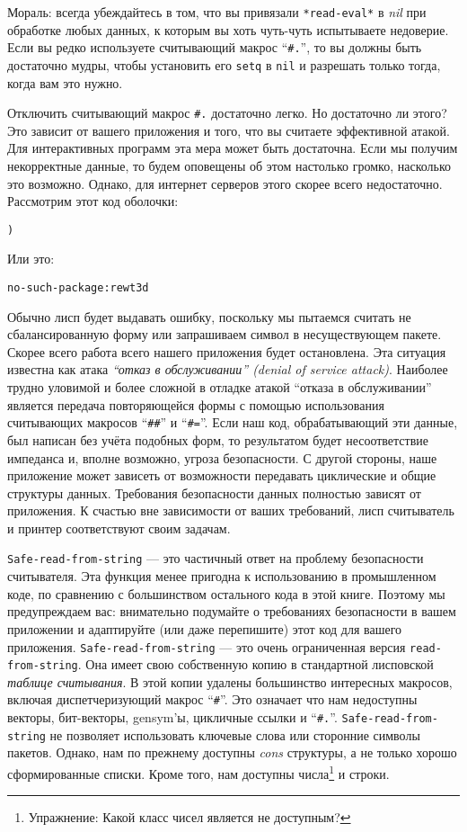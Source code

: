 Мораль: всегда убеждайтесь в том, что вы привязали \verb"*read-eval*" в \emph{nil} при обработке любых данных, к которым вы хоть чуть-чуть испытываете недоверие. Если вы редко используете считывающий макрос ``\verb"#."'', то вы должны быть достаточно мудры, чтобы установить его \verb"setq" в \verb"nil" и разрешать только тогда, когда вам это нужно.

Отключить считывающий макрос \verb"#." достаточно легко. Но достаточно ли этого? Это зависит от вашего приложения и того, что вы считаете эффективной атакой. Для интерактивных программ эта мера может быть достаточна. Если мы получим некорректные данные, то будем оповещены об этом настолько громко, насколько это возможно. Однако, для интернет серверов этого скорее всего недостаточно. Рассмотрим этот код оболочки:

\begin{verbatim}
)
\end{verbatim}

Или это:

\begin{verbatim}
no-such-package:rewt3d
\end{verbatim}

Обычно лисп будет выдавать ошибку, поскольку мы пытаемся считать не сбалансированную форму или запрашиваем символ в несуществующем пакете. Скорее всего работа всего нашего приложения будет остановлена. Эта ситуация известна как атака \emph{``отказ в обслуживании'' (denial of service attack)}. Наиболее трудно уловимой и более сложной в отладке атакой ``отказа в обслуживании'' является передача повторяющейся формы с помощью использования считывающих макросов ``\verb"##"'' и ``\verb"#="''. Если наш код, обрабатывающий эти данные, был написан без учёта подобных форм, то результатом будет несоответствие импеданса и, вполне возможно, угроза безопасности. С другой стороны, наше приложение может зависеть от возможности передавать циклические и общие структуры данных. Требования безопасности данных полностью зависят от приложения. К счастью вне зависимости от ваших требований, лисп считыватель и принтер соответствуют своим задачам.

\verb"Safe-read-from-string" --- это частичный ответ на проблему безопасности считывателя. Эта функция менее пригодна к использованию в промышленном коде, по сравнению с большинством остального кода в этой книге. Поэтому мы предупреждаем вас: внимательно подумайте о требованиях безопасности в вашем приложении и адаптируйте (или даже перепишите) этот код для вашего приложения. \verb"Safe-read-from-string" --- это очень ограниченная версия \verb"read-from-string". Она имеет свою собственную копию в стандартной лисповской \emph{таблице считывания}. В этой копии удалены большинство интересных макросов, включая диспетчеризующий макрос ``\verb"#"''. Это означает что нам недоступны векторы, бит-векторы, gensym'ы, цикличные ссылки и ``\verb"#."''. \verb"Safe-read-from-string" не позволяет использовать ключевые слова или сторонние символы пакетов. Однако, нам по прежнему доступны \emph{cons} структуры, а не только хорошо сформированные списки. Кроме того, нам доступны числа\footnote{Упражнение: Какой класс чисел является не доступным?} и строки.

